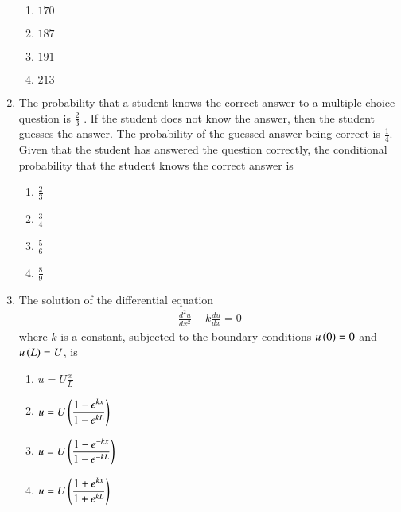 \documentclass[journal]{IEEEtran}
\numberwithin{equation}{enumi}
\numberwithin{figure}{enumi}
\begin{document}
\begin{enumerate}
    \begin{multicols}{4}
        \begin{enumerate}
            \item $170$
            \item $187$
            \item $191$
            \item $213$
        \end{enumerate}
    \end{multicols}

    \item
    The probability that a student knows the correct answer to a multiple choice question is $\frac{2}{3}$ . If the student does not know the answer, then the student guesses the answer. The probability of the guessed answer being correct is $\frac{1}{4}$. Given that the student has answered the question correctly, the conditional probability that the student knows the correct answer is

    \begin{multicols}{4}
        \begin{enumerate}
            \item $\frac{2}{3}$
            \item $\frac{3}{4}$
            \item $\frac{5}{6}$
            \item $\frac{8}{9}$
        \end{enumerate}
    \end{multicols}

    \item 
    The solution of the differential equation 
    \begin{align*}
        \frac{d^2u}{dx^2} - k\frac{du}{dx} = 0
    \end{align*}
    where $k$ is a constant, subjected to the boundary conditions $u\left(0\right) = 0$ and $u\left(L\right) = U$, is 

    \begin{multicols}{2}
        \begin{enumerate}
            \item $u = \displaystyle U \frac{x}{L}$
            \item $u = \displaystyle U\left(\frac{1-e^{kx}}{1-e^{kL}}\right)$
            \item $u = \displaystyle U\left(\frac{1-e^{-kx}}{1-e^{-kL}}\right)$
            \item $u = \displaystyle U\left(\frac{1+e^{kx}}{1+e^{kL}}\right)$
        \end{enumerate}
    \end{multicols}


\end{enumerate}
\end{document}
